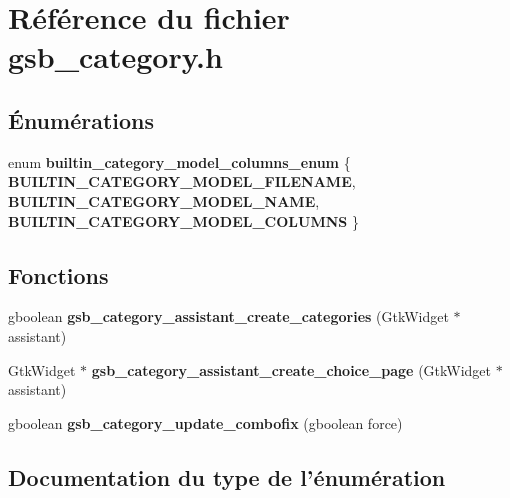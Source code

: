 \section{Référence du fichier gsb\_\-category.h}
\label{gsb__category_8h}
\subsection*{Énumérations}
\begin{DoxyCompactItemize}
\item 
enum {\bf builtin\_\-category\_\-model\_\-columns\_\-enum} \{ {\bf BUILTIN\_\-CATEGORY\_\-MODEL\_\-FILENAME}, 
{\bf BUILTIN\_\-CATEGORY\_\-MODEL\_\-NAME}, 
{\bf BUILTIN\_\-CATEGORY\_\-MODEL\_\-COLUMNS}
 \}
\end{DoxyCompactItemize}
\subsection*{Fonctions}
\begin{DoxyCompactItemize}
\item 
gboolean {\bf gsb\_\-category\_\-assistant\_\-create\_\-categories} (GtkWidget $\ast$assistant)
\item 
GtkWidget $\ast$ {\bf gsb\_\-category\_\-assistant\_\-create\_\-choice\_\-page} (GtkWidget $\ast$assistant)
\item 
gboolean {\bf gsb\_\-category\_\-update\_\-combofix} (gboolean force)
\end{DoxyCompactItemize}


\subsection{Documentation du type de l'énumération}
